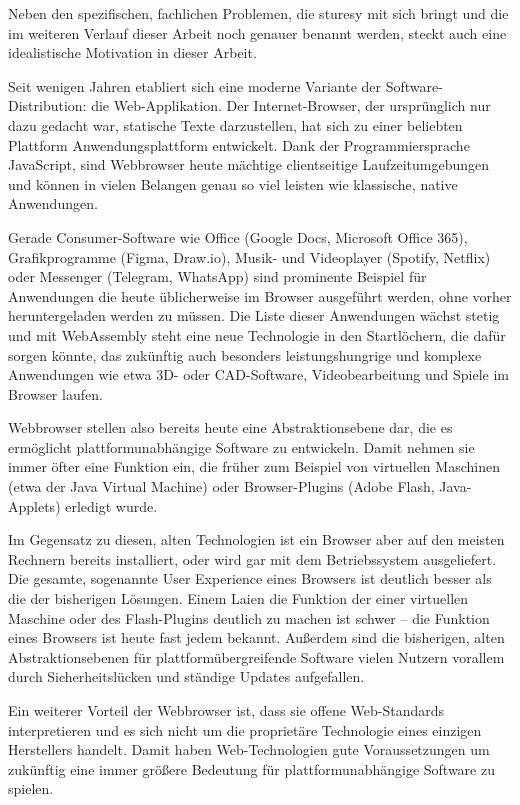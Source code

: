 Neben den spezifischen, fachlichen Problemen, die \ac{sturesy} mit sich bringt und die im weiteren Verlauf dieser Arbeit noch genauer benannt werden, steckt auch eine idealistische Motivation in dieser Arbeit.

Seit wenigen Jahren etabliert sich eine moderne Variante der Software-Distribution: die Web-Applikation. Der Internet-Browser, der ursprünglich nur dazu gedacht war, statische Texte darzustellen, hat sich zu einer beliebten Plattform Anwendungsplattform entwickelt. Dank der Programmiersprache JavaScript, sind Webbrowser heute mächtige clientseitige Laufzeitumgebungen und können in vielen Belangen genau so viel leisten wie klassische, native Anwendungen.

Gerade Consumer-Software wie Office (Google Docs, Microsoft Office 365), Grafikprogramme (Figma, Draw.io), Musik- und Videoplayer (Spotify, Netflix) oder Messenger (Telegram, WhatsApp) sind prominente Beispiel für Anwendungen die heute üblicherweise im Browser ausgeführt werden, ohne vorher heruntergeladen werden zu müssen. Die Liste dieser Anwendungen wächst stetig und mit WebAssembly steht eine neue Technologie in den Startlöchern, die dafür sorgen könnte, das zukünftig auch besonders leistungshungrige und komplexe Anwendungen wie etwa 3D- oder CAD-Software, Videobearbeitung und Spiele im Browser laufen.

Webbrowser stellen also bereits heute eine Abstraktionsebene dar, die es ermöglicht plattformunabhängige Software zu entwickeln. Damit nehmen sie immer öfter eine Funktion ein, die früher zum Beispiel von virtuellen Maschinen (etwa der Java Virtual Machine) oder Browser-Plugins (Adobe Flash, Java-Applets) erledigt wurde.

Im Gegensatz zu diesen, alten Technologien ist ein Browser aber auf den meisten Rechnern bereits installiert, oder wird gar mit dem Betriebssystem ausgeliefert. Die gesamte, sogenannte User Experience eines Browsers ist deutlich besser als die der bisherigen Lösungen. Einem Laien die Funktion der einer virtuellen Maschine oder des Flash-Plugins deutlich zu machen ist schwer – die Funktion eines Browsers ist heute fast jedem bekannt. Außerdem sind die bisherigen, alten Abstraktionsebenen für plattformübergreifende Software vielen Nutzern vorallem durch Sicherheitslücken und ständige Updates aufgefallen.

Ein weiterer Vorteil der Webbrowser ist, dass sie offene Web-Standards interpretieren und es sich nicht um die proprietäre Technologie eines einzigen Herstellers handelt. Damit haben Web-Technologien gute Voraussetzungen um zukünftig eine immer größere Bedeutung für plattformunabhängige Software zu spielen.

